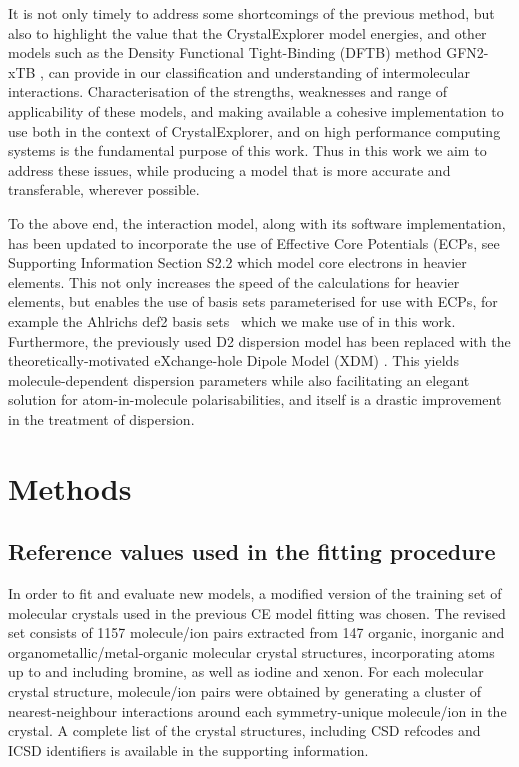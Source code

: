\documentclass[preprint]{iucr}              %
\begin{document}
It is not only timely to address some shortcomings of the previous method, but also to highlight the 
value that the CrystalExplorer model energies, and other models such as the Density Functional Tight-Binding (DFTB)
method GFN2-xTB \cite{Bannwarth2019}, can provide in our classification and understanding of intermolecular interactions.
Characterisation of the strengths, weaknesses and range of applicability of these models, and making available a
cohesive implementation to use both in the context of CrystalExplorer, and on high performance computing systems is
the fundamental purpose of this work. Thus in this work we aim to address these issues, while producing a model that
is more accurate and transferable, wherever possible.

To the above end, the interaction model, along with its software implementation, has been updated to incorporate the use of Effective Core 
Potentials (ECPs, see Supporting Information Section S2.2 %
which model core electrons in heavier elements.
This not only increases the speed of the calculations for heavier elements, but enables the use of basis sets parameterised for use with ECPs, for example the Ahlrichs def2 basis sets~\cite{Weigend2005} which we make use of in this work.
Furthermore, the previously used D2 dispersion model \cite{Grimme2006} has been replaced with the theoretically-motivated eXchange-hole Dipole Model (XDM) \cite{Johnson2006,Johnson2007,Otero-de-la-Roza2012a}.
This yields molecule-dependent dispersion parameters while also facilitating an elegant solution for atom-in-molecule polarisabilities, and itself is a drastic improvement in the treatment of dispersion.


\section{Methods}

\subsection{Reference values used in the fitting procedure}
In order to fit and evaluate new models, a modified version of the training set of molecular crystals used in the previous
CE model fitting \cite{Mackenzie2017} was chosen. The revised set consists of 1157 molecule/ion pairs extracted from 147 organic,
inorganic and organometallic/metal-organic molecular crystal structures, incorporating atoms up to and including bromine,
as well as iodine and xenon. For each molecular crystal structure, molecule/ion pairs were obtained by generating a 
cluster of nearest-neighbour interactions around each symmetry-unique molecule/ion in the crystal. A complete list of
the crystal structures, including CSD refcodes \cite{Groom2016} and ICSD identifiers \cite{Levin2020} is available in the supporting information.
\end{document}
